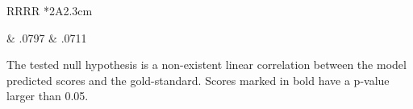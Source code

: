 \begin{table}
\begin{ThreePartTable}
\begin{tabularx}{\textwidth}{RRRR *{2}{A{2.3cm}}}

     & .0797 & .0711 \\  

    \bottomrule
    \end{tabularx}
    \begin{tablenotes}
        \footnotesize
        \item[] The tested null hypothesis is a non-existent linear correlation between the model predicted scores and the gold-standard. Scores marked in bold have a p-value larger than 0.05.
    \end{tablenotes}
    \end{ThreePartTable}
    
    \caption[French Semantic Space Semantic Ranking Task Results]{Possibly due to the poor quality of French benchmark datasets, baseline scores with  is much lower than the English counterpart.  has high performance in \similarity and negligible \association scores. The relatively poor de-correlation between  and  resulted a debatable . Viewed by Pearson's  it seems to contain none of \similarity and \association information, judged by Spearman's , both axes' information are present in the space. All p-values reported for  are close to the significance threshold. Still,  holds higher scores in \association than \similarity.  however, cancels out completely \association information even compared with  while retained \similarity signals.}
    \label{tab:fredecorrelationscores}
    \end{table}